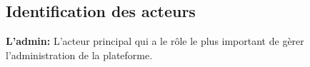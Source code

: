 \subsection{Identification des acteurs}

\textbf{L’admin: }L’acteur principal qui a le rôle le plus important de gèrer l’administration de la plateforme.


